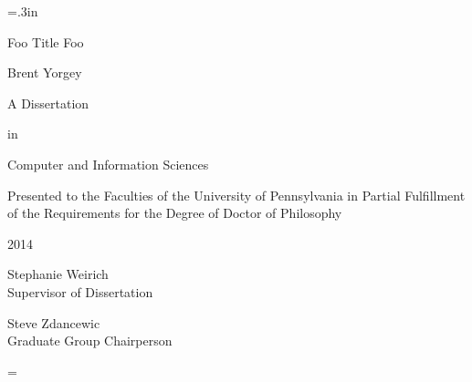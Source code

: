 \documentclass[12pt]{memoir}
\newif\ifdraft\drafttrue
\newcommand{\doublespaced}{\renewcommand{\baselinestretch}{2}\normalfont}
\newcommand{\singlespaced}{\renewcommand{\baselinestretch}{1}\normalfont}
\newcommand{\draftspaced}{\ifdraft\singlespaced\else\doublespaced\fi}
\numberwithin{equation}{section}
\def\thetitle{Foo Title Foo}
\def\theauthor{Brent Yorgey}
\def\theyear{2014}
\begin{document}
\doublespaced
\large\newlength{\oldparskip}\setlength\oldparskip{\parskip}\parskip=.3in
\thispagestyle{empty}
\begin{center}
\vspace*{\fill}
\thetitle

\theauthor


A Dissertation

in

Computer and Information Sciences
\end{center}


\noindent\singlespaced\large
Presented to the Faculties of the University of Pennsylvania in Partial
Fulfillment of the Requirements for the Degree of Doctor of Philosophy


\doublespaced\large
\begin{center}
\theyear
\end{center}


\noindent\makebox[0in][l]{\rule[2ex]{3in}{.3mm}}
\singlespaced
Stephanie Weirich\\
Supervisor of Dissertation


\noindent\makebox[0in][l]{\rule[2ex]{3in}{.3mm}}
\singlespaced
Steve Zdancewic\\
Graduate Group Chairperson
\vspace*{\fill}

\normalsize\parskip=\oldparskip





\newpage
\tableofcontents

\newpage
\draftspaced
{}









\end{document}
